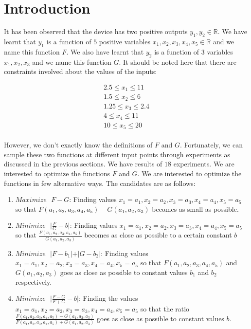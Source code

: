 \documentclass[11pt]{article}
\begin{document}
\maketitle
\section{Introduction}
It has been observed that the device has two positive outputs $y_1,y_2 \in \mathbb{R}$. We have learnt that $y_1$ is a function of $5$ positive variables $x_1,x_2,x_3,x_4,x_5 \in \mathbb{R}$ and we name this function $F$. We also have learnt that $y_2$ is a function of $3$ variables $x_1,x_2,x_3$ and we name this function $G$. It should be noted here that there are constraints involved about the values of the inputs:
\begin{tiny}
\begin{eqnarray*}
2.5 \leq x_1 \leq 11 \\
1.5 \leq x_2 \leq 6 \\
1.25 \leq x_3 \leq 2.4 \\
4 \leq x_4 \leq 11 \\
10 \leq x_5 \leq 20 \\
\end{eqnarray*}
\end{tiny} However, we don't exactly know the definitions of $F$ and $G$. Fortunately, we can sample these two functions at different input points through experiments as discussed in the previous sections. We have results of $18$ experiments. We are interested to optimize the functions $F$ and $G$. We are interested to optimize the functions in few alternative ways. The candidates are as follows:
\begin{enumerate}
\item $Maximize \text{ }F - G$: Finding values $x_1 = a_1,x_2 = a_2,x_3 = a_3,x_4 = a_4,x_5 = a_5$ so that $F(a_1,a_2,a_3,a_4,a_5) - G(a_1,a_2,a_3)$ becomes as small as possible.
\item $Minimize \text{ } \vert\frac{F}{G}-b\vert$: Finding values $x_1 = a_1,x_2 = a_2,x_3 = a_3,x_4 = a_4,x_5 = a_5$ so that $\frac{F(a_1,a_2,a_3,a_4,a_5)}{G(a_1,a_2,a_3)}$ becomes as close as possible to a certain constant $b$
\item $Minimize \text{ } \vert F-b_1 \vert + \vert G-b_2 \vert$: Finding values $x_1 = a_1,x_2 = a_2,x_3 = a_3,x_4 = a_4,x_5 = a_5$ so that $F(a_1,a_2,a_3,a_4,a_5)$ and $G(a_1,a_2,a_3)$  goes as close as possible to constant values $b_1$ and $b_2$ respectively.
\item $Minimize \text{ } \vert \frac{F-G}{F+G} - b\vert$: Finding the values $x_1 = a_1,x_2 = a_2,x_3 = a_3,x_4 = a_4,x_5 = a_5$ so that the ratio $\frac{F(a_1,a_2,a_3,a_4,a_5) - G(a_1,a_2,a_3)}{F(a_1,a_2,a_3,a_4,a_5) + G(a_1,a_2,a_3)}$  goes as close as possible to constant values $b$.
\end{enumerate}
\end{document}
